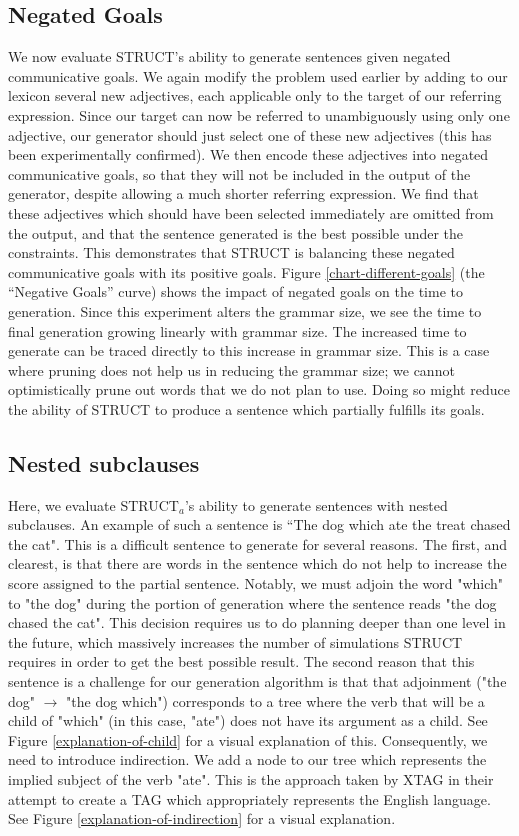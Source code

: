 \subsection{Negated Goals}
We now evaluate STRUCT's ability to generate
sentences given negated communicative goals.  We again modify
the problem used earlier by 
adding to our lexicon several new adjectives, each applicable only to
the target of our referring expression.  Since our target can now be
referred to unambiguously using only one adjective, our generator
should just select one of these new adjectives (this has been experimentally confirmed).
We then encode these
adjectives into negated communicative goals, so that they will not be
included in the output of the generator, despite allowing a much
shorter referring expression.  We find that these adjectives which
should have been selected immediately are omitted from the output, and
that the sentence generated is the best possible under the
constraints.  This demonstrates that STRUCT is balancing these negated
communicative goals with its positive goals.  Figure
\ref{chart-different-goals} (the ``Negative Goals'' curve) shows the
impact of negated goals on the time to generation.  Since this
experiment alters the grammar size, we see the time to final
generation growing linearly with grammar size.  The increased time to
generate can be traced directly to this increase in grammar size.
This is a case where pruning does not help us in reducing the grammar size;
we cannot optimistically prune out words that we do not plan to use.  Doing
so might reduce the ability of STRUCT to produce a sentence which partially
fulfills its goals.

\subsection{Nested subclauses}

Here, we evaluate STRUCT$_a$'s ability to generate sentences with nested
subclauses.  An example of such a sentence is ``The dog which ate the treat
chased the cat".  This is a difficult sentence to generate for several reasons.
The first, and clearest, is that there are words in the sentence which do not
help to increase the score assigned to the partial sentence.  Notably, we must adjoin
the word "which" to "the dog" during the portion of generation where the
sentence reads "the dog chased the cat".  This decision requires us to do planning
deeper than one level in the future, which massively increases the number of simulations
STRUCT requires in order to get the best possible result.  The second reason that
this sentence is a challenge for our generation algorithm is that that adjoinment
("the dog" $\rightarrow$ "the dog which") corresponds to a tree where the verb
that will be a child of "which" (in this case, "ate") does not have its argument as a child.
See Figure \ref{explanation-of-child} for a visual explanation of this.  Consequently,
we need to introduce indirection.  We add a node to our tree which represents the
implied subject of the verb "ate".  This is the approach taken by XTAG \cite{xtag} in
their attempt to create a TAG which appropriately represents the English language.
See Figure \ref{explanation-of-indirection} for a visual explanation.

